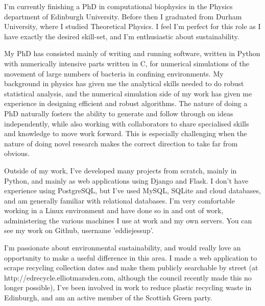 I'm currently finishing a PhD in computational biophysics in the Physics department of Edinburgh University. Before then I graduated from Durham University, where I studied Theoretical Physics. I feel I'm perfect for this role as I have exactly the desired skill-set, and I'm enthusiastic about sustainability.

My PhD has consisted mainly of writing and running software, written in Python with numerically intensive parts written in C, for numerical simulations of the movement of large numbers of bacteria in confining environments. My background in physics has given me the analytical skills needed to do robust statistical analysis, and the numerical simulation side of my work has given me experience in designing efficient and robust algorithms. The nature of doing a PhD naturally fosters the ability to generate and follow through on ideas independently, while also working with collaborators to share specialised skills and knowledge to move work forward. This is especially challenging when the nature of doing novel research makes the correct direction to take far from obvious.

Outside of my work, I've developed many projects from scratch, mainly in Python, and mainly as web applications using Django and Flask. I don't have experience using PostgreSQL, but I've used MySQL, SQLite and cloud databases, and am generally familiar with relational databases. I'm very comfortable working in a Linux environment and have done so in and out of work, administering the various machines I use at work and my own servers. You can see my work on Github, username 'eddiejessup'.

I'm passionate about environmental sustainability, and would really love an opportunity to make a useful difference in this area. I made a web application to scrape recycling collection dates and make them publicly searchable by street (at http://edrecycle.elliotmarsden.com, although the council recently made this no longer possible), I've been involved in work to reduce plastic recycling waste in Edinburgh, and am an active member of the Scottish Green party.
